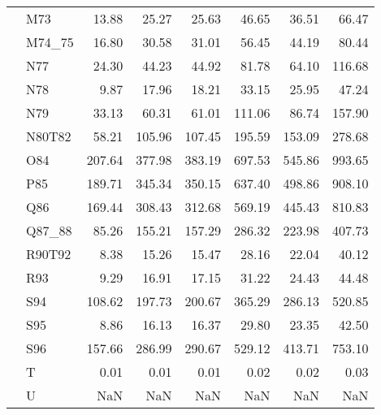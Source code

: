 \begin{tabular}{llrrrrrr}
 & M73 & 13.88 & 25.27 & 25.63 & 46.65 & 36.51 & 66.47 \\
 & M74\_75 & 16.80 & 30.58 & 31.01 & 56.45 & 44.19 & 80.44 \\
 & N77 & 24.30 & 44.23 & 44.92 & 81.78 & 64.10 & 116.68 \\
 & N78 & 9.87 & 17.96 & 18.21 & 33.15 & 25.95 & 47.24 \\
 & N79 & 33.13 & 60.31 & 61.01 & 111.06 & 86.74 & 157.90 \\
 & N80T82 & 58.21 & 105.96 & 107.45 & 195.59 & 153.09 & 278.68 \\
 & O84 & 207.64 & 377.98 & 383.19 & 697.53 & 545.86 & 993.65 \\
 & P85 & 189.71 & 345.34 & 350.15 & 637.40 & 498.86 & 908.10 \\
 & Q86 & 169.44 & 308.43 & 312.68 & 569.19 & 445.43 & 810.83 \\
 & Q87\_88 & 85.26 & 155.21 & 157.29 & 286.32 & 223.98 & 407.73 \\
 & R90T92 & 8.38 & 15.26 & 15.47 & 28.16 & 22.04 & 40.12 \\
 & R93 & 9.29 & 16.91 & 17.15 & 31.22 & 24.43 & 44.48 \\
 & S94 & 108.62 & 197.73 & 200.67 & 365.29 & 286.13 & 520.85 \\
 & S95 & 8.86 & 16.13 & 16.37 & 29.80 & 23.35 & 42.50 \\
 & S96 & 157.66 & 286.99 & 290.67 & 529.12 & 413.71 & 753.10 \\
 & T & 0.01 & 0.01 & 0.01 & 0.02 & 0.02 & 0.03 \\
 & U & NaN & NaN & NaN & NaN & NaN & NaN \\
\cline{1-8}
\bottomrule
\end{tabular}
